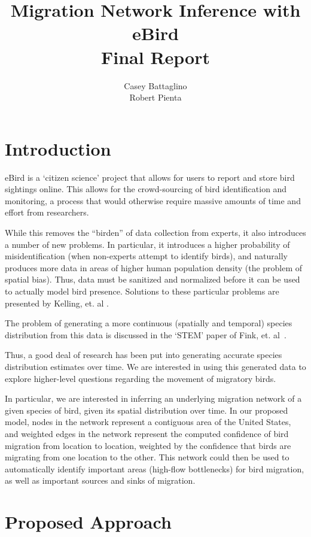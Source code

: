\documentclass[11pt]{article}
\title{Migration Network Inference with eBird\\ Final Report\vspace{-8pt}}
\author{Casey Battaglino\\Robert Pienta}
\date{}
\begin{document}
\maketitle
\begin{multicols}{2}
\section{Introduction} \vspace{-10 pt}
eBird\cite{DBLP:conf/iaai/KellingGFLWYDG12} is a `citizen science' project that allows for users to report and store bird sightings online. This allows for the crowd-sourcing of bird identification and monitoring, a process that would otherwise require massive amounts of time and effort from researchers. 

While this removes the ``birden'' of data collection from experts, it also introduces a number of new problems. In particular, it introduces a higher probability of misidentification (when non-experts attempt to identify birds), and naturally produces more data in areas of higher human population density (the problem of spatial bias). Thus, data must be sanitized and normalized before it can be used to actually model bird presence. Solutions to these particular problems are presented by Kelling, et. al \cite{DBLP:conf/iaai/KellingGFLWYDG12}.

The problem of generating a more continuous (spatially and temporal) species distribution from this data is discussed in the `STEM' paper of Fink, et. al~\cite{stem}.

Thus, a good deal of research has been put into generating accurate species distribution estimates over time. We are interested in using this generated data to explore higher-level questions regarding the movement of migratory birds. 

In particular, we are interested in inferring an underlying migration network of a given species of bird, given its spatial distribution over time. In our proposed model, nodes in the network represent a contiguous area of the United States, and weighted edges in the network represent the computed confidence of bird migration from location to location, weighted by the confidence that birds are migrating from one location to the other. This network could then be used to automatically identify important areas (high-flow bottlenecks) for bird migration, as well as important sources and sinks of migration. 

\section{Proposed Approach} \vspace{-10 pt}

\end{multicols}
\end{document}
